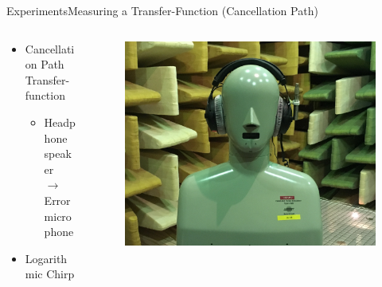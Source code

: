 \begin{frame}{Experiments}{Measuring a Transfer-Function (Cancellation Path)}		
	\begin{columns}
		\begin{column}{0.5\textwidth}
			\begin{itemize}
				\item Cancellation Path Transfer-function
				\begin{itemize}
					\item Headphone speaker \\ $\rightarrow$ Error microphone
				\end{itemize}
				\item{Logarithmic Chirp}
			\end{itemize}
		\end{column}
		\begin{column}{0.5\textwidth} 
			\begin{figure}[h]
				\includegraphics[width=1\textwidth]{figures/TransferFunctionCP}
			\end{figure}
		\end{column}
	\end{columns}
\end{frame}

